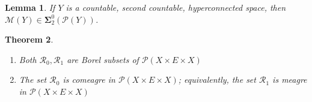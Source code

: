 \documentclass[10pt,a4paper]{amsart}
\newtheorem{thm}{Theorem}[section]
\newtheorem{lem}[thm]{Lemma}
\newcommand{\bsigma}{\boldsymbol\Sigma}
\begin{document}
\setcounter{section}{3}
\setcounter{equation}{1}
\setcounter{thm}{12}
\begin{lem} \label{lem:newcorr}
If $Y$ is a countable, second countable, hyperconnected space, then $ \mathcal M (Y)\in \bsigma^0_2( \mathcal P (Y))$.
\end{lem}

\setcounter{section}{3}
\setcounter{equation}{1}
\setcounter{thm}{17}
\begin{thm} \label{thm:trn}
\begin{enumerate}
\item\label{thm:trn:1} Both $ \mathcal R_0, \mathcal R_1$ are Borel subsets of $ \mathcal P (X\times E\times X)$
\item\label{thm:trn:2} The set $ \mathcal R_0$ is comeagre in $ \mathcal P (X\times E\times X)$; equivalently, the set $ \mathcal R_1$ is meagre in $ \mathcal P (X\times E\times X)$
\end{enumerate}
\end{thm}
\end{document}
